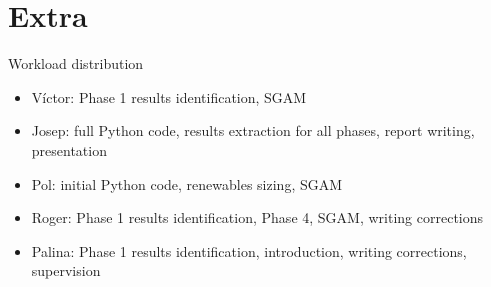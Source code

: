   \section{Extra}
  \begin{frame}{Workload distribution}
    \begin{itemize}
      \item Víctor: Phase 1 results identification, SGAM
      \item Josep: full Python code, results extraction for all phases, report writing, presentation
      \item Pol: initial Python code, renewables sizing, SGAM
      \item Roger: Phase 1 results identification, Phase 4, SGAM, writing corrections
      \item Palina: Phase 1 results identification, introduction, writing corrections, supervision
    \end{itemize}

  \end{frame}

